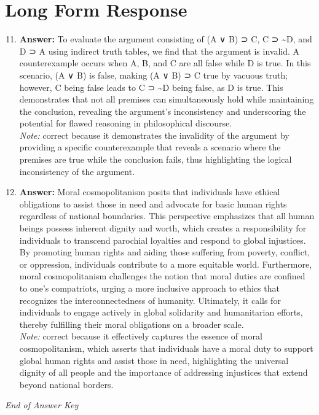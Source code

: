 \documentclass[12pt]{article}
\begin{document}
\section*{Long Form Response}
\begin{enumerate}[label=\arabic*.]
\setcounter{enumi}{10}
\item \textbf{Answer:} To evaluate the argument consisting of (A ∨ B) ⊃ C, C ⊃ \textasciitilde{}D, and D ⊃ A using indirect truth tables, we find that the argument is invalid. A counterexample occurs when A, B, and C are all false while D is true. In this scenario, (A ∨ B) is false, making (A ∨ B) ⊃ C true by vacuous truth; however, C being false leads to C ⊃ \textasciitilde{}D being false, as D is true. This demonstrates that not all premises can simultaneously hold while maintaining the conclusion, revealing the argument's inconsistency and underscoring the potential for flawed reasoning in philosophical discourse.
\\ \textit{Note:} correct because it demonstrates the invalidity of the argument by providing a specific counterexample that reveals a scenario where the premises are true while the conclusion fails, thus highlighting the logical inconsistency of the argument.
\item \textbf{Answer:} Moral cosmopolitanism posits that individuals have ethical obligations to assist those in need and advocate for basic human rights regardless of national boundaries. This perspective emphasizes that all human beings possess inherent dignity and worth, which creates a responsibility for individuals to transcend parochial loyalties and respond to global injustices. By promoting human rights and aiding those suffering from poverty, conflict, or oppression, individuals contribute to a more equitable world. Furthermore, moral cosmopolitanism challenges the notion that moral duties are confined to one's compatriots, urging a more inclusive approach to ethics that recognizes the interconnectedness of humanity. Ultimately, it calls for individuals to engage actively in global solidarity and humanitarian efforts, thereby fulfilling their moral obligations on a broader scale.
\\ \textit{Note:} correct because it effectively captures the essence of moral cosmopolitanism, which asserts that individuals have a moral duty to support global human rights and assist those in need, highlighting the universal dignity of all people and the importance of addressing injustices that extend beyond national borders.
\end{enumerate}

\vfill
\noindent\textit{End of Answer Key}
\end{document}
